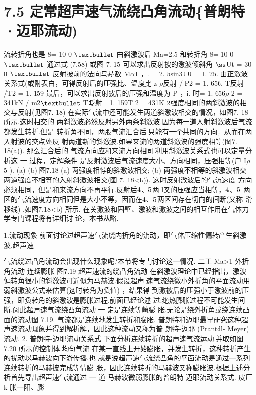 \section*{7.5  定常超声速气流绕凸角流动\{普朗特·迈耶流动)}

流转折角也是 8= 10 0 ${\rm •}$ 由斜激波后 Ma=2.5 和转折角 8= 10 0 ${\rm •}$ 通过式 (7.58) 或图 7. 15 可以求出反射披的激波倾斜角 ${\rm ß}$Ut = 30 0 ${\rm •}$ 反射披前的法向马赫数 M$\alpha$1 ，. = 2. 5sin30 0 = 1. 25. 由正激波关系式(或附表白，可得反射后的压强比、温度比 z $\rho$反射 / P2 = 1. 656. T反射 /T2 = 1. 159 最后，可以求出反射披后的压强和温度为 P ，i. 时= 1. 656$\rho$ 2 = 341kN / m2${\rm •}$ T眨射= 1. 159T 2 = 431K ${\rm 2}$强度相同的两斜激波的相交与反射(见图7. 18) 在实际气流中还可能发生两道斜激波相交的情况，如图7. 18 所示.这时相交的 两斜激波必然反射另外两条斜激波.因为每一道人射斜激波后气流都发生转折.但是 转折角不同，两股气流汇合后.只能有一个共同的方向，从而在两入射波的交点处反 射两道新的斜激波.如果来流的两道斜激波的强度相等(图7. 18(a)). 那么汇合后的 气流方向应和来流方向相同.利用斜激波关系式也可以定量分析这 一 过程，定解条件 是反射激波后气流速度大小、方向相同，压强相等(户 I$\rho$5 ). (a) (b) 图7.18 (a) 两强度相悖的斜激波相交; (b) 两强度不相等的斜激波相交 两道强度不相等的入射斜激波相交(图 7. 18<b)). 这时反射激波后的气流速度 方向必须相同，但是和来流方向不再平行.反射后${\rm 4}$、${\rm 5}$两 l叉的压强应当相等，${\rm 4}$、${\rm 5}$ 两区的气流速度方向相同但是大小不等，因而在${\rm 4}$、${\rm 5}$两区间存在切向的间断(又称 滑移线) .如图7.18<b) 所示. 在关激波和固壁、激波和激波之间的相互作用在气体力学专门课程将有详细讨 论，本书从略.

1.流动现象 前面讨论过超声速气流绕内折角的流动，即气体压缩性偏转产生斜激波.超声速

气流绕过凸角流动会出现什么现象呢?本节将专门讨论这一情况. 二工 Ma>1 外折角流动 连续膨胀 图7.19 超声速流的绕凸角流动 在斜激波理论中已经指出，激波偏转角很小的斜激波可近似为马赫波.假设超声 速气流绕微小外折角的平面流动用弱斜激波公式来估算(这时转角为负值) ，结果得 到激被后的压强小于激波前的压强，即负转角的斜激波是膨胀过程.前面已经论述 过:绝热膨胀过程不可能发生间断.闵此超声速气流绕凸角流动 一 定是连续等崎膨 胀.无论是绕外折角或绕连续凸面的流动图 7.19. 气流都是连续地发生转折和膨胀. 普朗特和迈耶最早研究这种超声速流动现象并得到解析解，因此这种流动又称为普 朗特-迈耶 (Prantdl- Meyer) 流动. 2. 普朗特-迈耶流动关系式 下面分析连续转折的超声速气流运动.并取如图 7.20 所示的控制体.均匀气流 在某一直线上开始膨胀，并发生转折，这种转折产生的扰动以马赫波向下游传播.也 就是说超声速气流绕凸角的平面流动是通过一系列连续转折的马赫披完成等情膨 胀，因此连续转折的马赫波又称膨胀波.根据上述分析首先导出超声速气流通过 一 道 马赫波微弱膨胀的普朗特-迈耶流动关系式. 皮厂 k 胀一阳、膨

